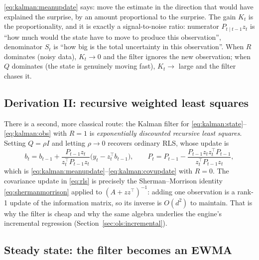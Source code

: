 \begin{intuition}
\eqref{eq:kalman:meanupdate} says: move the estimate in the direction that would have
explained the surprise, by an amount proportional to the surprise. The gain $K_t$ is the
proportionality, and it is exactly a signal-to-noise ratio: numerator
$P_{t\mid t-1}z_t$ is ``how much would the state have to move to produce this
observation'', denominator $S_t$ is ``how big is the total uncertainty in this
observation''. When $R$ dominates (noisy data), $K_t\to0$ and the filter ignores the new
observation; when $Q$ dominates (the state is genuinely moving fast), $K_t\to$ large and
the filter chases it.
\end{intuition}

\subsection{Derivation II: recursive weighted least squares}
\label{sec:kalman:rls}

There is a second, more classical route: the Kalman filter for \eqref{eq:kalman:state}--
\eqref{eq:kalman:obs} with $R=1$ is \emph{exponentially discounted recursive least
squares}. Setting $Q=\rho I$ and letting $\rho\to0$ recovers ordinary RLS, whose update
is
\begin{equation}
  b_t = b_{t-1} + \frac{P_{t-1}z_t}{z_t^{\top}P_{t-1}z_t}\bigl(y_t-z_t^{\top}b_{t-1}\bigr),
  \qquad
  P_t = P_{t-1} - \frac{P_{t-1}z_tz_t^{\top}P_{t-1}}{z_t^{\top}P_{t-1}z_t},
  \label{eq:rls}
\end{equation}
which is \eqref{eq:kalman:meanupdate}--\eqref{eq:kalman:covupdate} with $R=0$. The
covariance update in \eqref{eq:rls} is precisely the Sherman--Morrison identity
\eqref{eq:shermanmorrison} applied to $(A+z z^{\top})^{-1}$: adding one observation is a
rank-1 update of the information matrix, so its inverse is $O(d^2)$ to maintain. That is
why the filter is cheap and why the same algebra underlies the engine's incremental
regression (Section~\ref{sec:ols:incremental}).

\subsection{Steady state: the filter becomes an EWMA}
\label{sec:kalman:steady}

